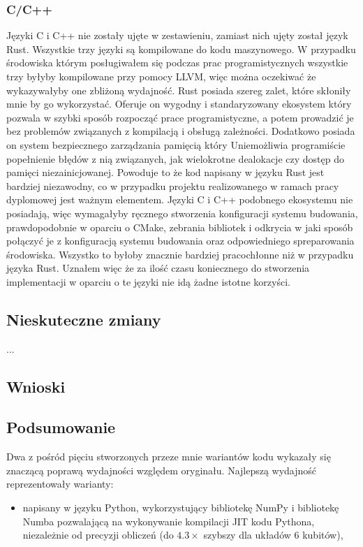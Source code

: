 \documentclass[11pt, a4paper]{article}
\begin{document}
\begin{sloppypar}
    \subsubsection{C/C++}
    Języki C i C++ nie zostały ujęte w zestawieniu, zamiast nich ujęty został język Rust.
    Wszystkie trzy języki są kompilowane do kodu maszynowego. W przypadku środowiska
    którym posługiwałem się podczas prac programistycznych wszystkie trzy byłyby
    kompilowane przy pomocy LLVM, więc można oczekiwać że wykazywałyby one zbliżoną wydajność.
    Rust posiada szereg zalet, które skłoniły mnie by go wykorzystać. Oferuje on wygodny
    i standaryzowany ekosystem który pozwala w szybki sposób rozpocząć prace
    programistyczne, a potem prowadzić je bez problemów związanych z kompilacją i obsługą
    zależności. Dodatkowo posiada on system bezpiecznego zarządzania pamięcią który
    Uniemożliwia programiście popełnienie błędów z nią związanych, jak wielokrotne dealokacje
    czy dostęp do pamięci niezainicjowanej. Powoduje to że kod napisany w języku Rust
    jest bardziej niezawodny, co w przypadku projektu realizowanego w ramach pracy dyplomowej
    jest ważnym elementem. Języki C i C++ podobnego ekosystemu nie posiadają, więc wymagałyby
    ręcznego stworzenia konfiguracji systemu budowania, prawdopodobnie w oparciu o CMake,
    zebrania bibliotek i odkrycia w jaki sposób połączyć je z konfiguracją systemu budowania
    oraz odpowiedniego spreparowania środowiska. Wszystko to byłoby znacznie bardziej
    pracochłonne niż w przypadku języka Rust. Uznałem więc że za ilość czasu koniecznego
    do stworzenia implementacji w oparciu o te języki nie idą żadne istotne korzyści.

    \subsection{Nieskuteczne zmiany}
    ...

    \subsection{Wnioski}
    \subsection{Podsumowanie}
    Dwa z pośród pięciu stworzonych przeze mnie wariantów kodu wykazały się znaczącą
    poprawą wydajności względem oryginału. Najlepszą wydajność reprezentowały warianty:
    \begin{itemize}
      \item napisany w języku Python, wykorzystujący bibliotekę NumPy i bibliotekę Numba
        pozwalającą na wykonywanie kompilacji JIT kodu Pythona, niezależnie od precyzji obliczeń
        (do $4.3\times$ szybszy dla układów 6 kubitów),


\end{itemize}
\end{sloppypar}
\end{document}
